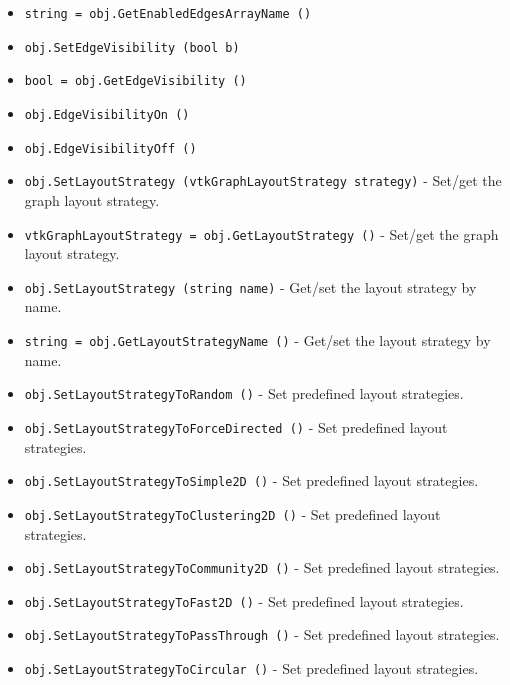 \begin{itemize}
\item  \verb|string = obj.GetEnabledEdgesArrayName ()|

\item  \verb|obj.SetEdgeVisibility (bool b)|

\item  \verb|bool = obj.GetEdgeVisibility ()|

\item  \verb|obj.EdgeVisibilityOn ()|

\item  \verb|obj.EdgeVisibilityOff ()|

\item  \verb|obj.SetLayoutStrategy (vtkGraphLayoutStrategy strategy)| -  Set/get the graph layout strategy.

\item  \verb|vtkGraphLayoutStrategy = obj.GetLayoutStrategy ()| -  Set/get the graph layout strategy.

\item  \verb|obj.SetLayoutStrategy (string name)| -  Get/set the layout strategy by name.

\item  \verb|string = obj.GetLayoutStrategyName ()| -  Get/set the layout strategy by name.

\item  \verb|obj.SetLayoutStrategyToRandom ()| -  Set predefined layout strategies.

\item  \verb|obj.SetLayoutStrategyToForceDirected ()| -  Set predefined layout strategies.

\item  \verb|obj.SetLayoutStrategyToSimple2D ()| -  Set predefined layout strategies.

\item  \verb|obj.SetLayoutStrategyToClustering2D ()| -  Set predefined layout strategies.

\item  \verb|obj.SetLayoutStrategyToCommunity2D ()| -  Set predefined layout strategies.

\item  \verb|obj.SetLayoutStrategyToFast2D ()| -  Set predefined layout strategies.

\item  \verb|obj.SetLayoutStrategyToPassThrough ()| -  Set predefined layout strategies.

\item  \verb|obj.SetLayoutStrategyToCircular ()| -  Set predefined layout strategies.


\end{itemize}
